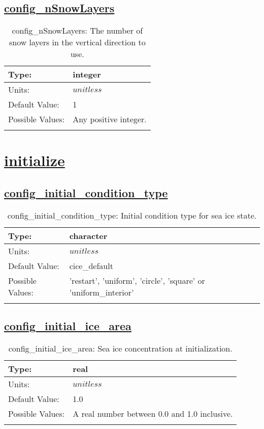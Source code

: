 \subsection[config\_nSnowLayers]{\hyperref[sec:nm_tab_dimensions]{config\_nSnowLayers}}
\label{subsec:nm_sec_config_nSnowLayers}
\begin{center}
\begin{longtable}{| p{2.0in} || p{4.0in} |}
    \hline
    Type: & integer \\
    \hline
    Units: & $unitless$ \\
    \hline
    Default Value: & 1 \\
    \hline
    Possible Values: & Any positive integer. \\
    \hline
    \caption{config\_nSnowLayers: The number of snow layers in the vertical direction to use.}
\end{longtable}
\end{center}
\section[initialize]{\hyperref[sec:nm_tab_initialize]{initialize}}
\label{sec:nm_sec_initialize}
\subsection[config\_initial\_condition\_type]{\hyperref[sec:nm_tab_initialize]{config\_initial\_condition\_type}}
\label{subsec:nm_sec_config_initial_condition_type}
\begin{center}
\begin{longtable}{| p{2.0in} || p{4.0in} |}
    \hline
    Type: & character \\
    \hline
    Units: & $unitless$ \\
    \hline
    Default Value: & cice\_default \\
    \hline
    Possible Values: & 'restart', 'uniform', 'circle', 'square' or 'uniform\_interior' \\
    \hline
    \caption{config\_initial\_condition\_type: Initial condition type for sea ice state.}
\end{longtable}
\end{center}
\subsection[config\_initial\_ice\_area]{\hyperref[sec:nm_tab_initialize]{config\_initial\_ice\_area}}
\label{subsec:nm_sec_config_initial_ice_area}
\begin{center}
\begin{longtable}{| p{2.0in} || p{4.0in} |}
    \hline
    Type: & real \\
    \hline
    Units: & $unitless$ \\
    \hline
    Default Value: & 1.0 \\
    \hline
    Possible Values: & A real number between 0.0 and 1.0 inclusive. \\
    \hline
    \caption{config\_initial\_ice\_area: Sea ice concentration at initialization.}
\end{longtable}
\end{center}
